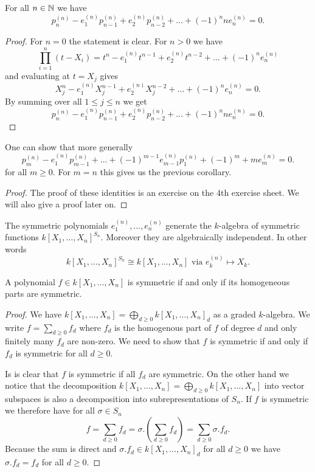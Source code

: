 \begin{cor}
 For all $n \in \mathbb{N}$ we have
 \[
  p^{(n)}_n - e^{(n)}_1 p^{(n)}_{n-1} + e^{(n)}_2 p^{(n)}_{n-2} + \ldots + (-1)^n n e^{(n)}_n = 0.
 \]
\end{cor}
\begin{proof}
 For $n = 0$ the statement is clear. For $n > 0$ we have
 \[
  \prod_{i=1}^n (t-X_i) = t^n - e^{(n)}_1 t^{n-1} + e^{(n)}_2 t^{n-2} + \ldots + (-1)^n e^{(n)}_n
 \]
 and evaluating at $t = X_j$ gives
 \[
  X_j^n - e^{(n)}_1 X_j^{n-1} + e^{(n)}_2 X_j^{n-2} + \ldots + (-1)^n e^{(n)}_n = 0.
 \]
 By summing over all $1 \leq j \leq n$ we get
 \[
  p^{(n)}_n - e^{(n)}_1 p^{(n)}_{n-1} + e^{(n)}_2 p^{(n)}_{n-2} + \ldots + (-1)^n n e^{(n)}_n = 0.
 \]
\end{proof}


\begin{rem}
 One can show that more generally
 \[
  p^{(n)}_m - e^{(n)}_1 p^{(n)}_{m-1} + \ldots + (-1)^{m-1} e^{(n)}_{m-1} p^{(n)}_1 + (-1)^m+ m e^{(n)}_m = 0.
 \]
 for all $m \geq 0$. For $m = n$ this gives us the previous corollary.
\end{rem}
\begin{proof}
 The proof of these identities is an exercise on the 4th exercise sheet. We will also give a proof later on.
\end{proof}


\begin{thrm}
 The symmetric polynomials $e^{(n)}_1, \ldots, e^{(n)}_n$ generate the $k$-algebra of symmetric functions $k[X_1, \ldots, X_n]^{S_n}$. Moreover they are algebraically independent. In other words
 \[
  k[X_1, \ldots, X_n]^{S_n} \cong k[X_1, \ldots, X_n] \text{ via } e^{(n)}_k \mapsto X_k.
 \]
\end{thrm}


\begin{lem}
 A polynomial $f \in k[X_1, \ldots, X_n]$ is symmetric if and only if its homogeneous parts are symmetric.
\end{lem}
\begin{proof}
 We have $k[X_1, \ldots, X_n] = \bigoplus_{d \geq 0} k[X_1, \ldots, X_n]_d$ as a graded $k$-algebra. We write $f = \sum_{d \geq 0} f_d$ where $f_d$ is the homogenous part of $f$ of degree $d$ and only finitely many $f_d$ are non-zero. We need to show that $f$ is symmetric if and only if $f_d$ is symmetric for all $d \geq 0$.
 
 Is is clear that $f$ is symmetric if all $f_d$ are symmetric. On the other hand we notice that the decomposition $k[X_1, \ldots, X_n] = \bigoplus_{d \geq 0} k[X_1, \ldots, X_n]$ into vector subspaces is also a decomposition into subrepresentations of $S_n$. If $f$ is symmetric we therefore have for all $\sigma \in S_n$
 \[
  f = \sum_{d \geq 0} f_d = \sigma.\left( \sum_{d \geq 0} f_d \right) = \sum_{d \geq 0} \sigma.f_d.
 \]
 Because the sum is direct and $\sigma.f_d \in k[X_1, \ldots, X_n]_d$ for all $d \geq 0$ we have $\sigma.f_d = f_d$ for all $d \geq 0$.
\end{proof}


